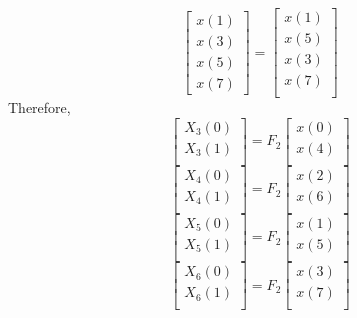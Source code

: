 \documentclass[journal,12pt,twocolumn]{IEEEtran}
\renewcommand\thesection{\arabic{section}}
\begin{document}
\begin{enumerate}[label=\arabic*.,ref=\thesection.\theenumi]
\begin{equation}
\begin{bmatrix}
x(1) \\ 
x(3) \\ 
x(5) \\
x(7)
\end{bmatrix}
 = 
\begin{bmatrix}
x(1) \\ 
x(5) \\ 
x(3) \\ 
x(7) \\
\end{bmatrix}
\end{equation}
Therefore,
\begin{equation}
\begin{bmatrix}
X_{3}(0) \\ 
X_{3}(1)\\ 
\end{bmatrix}
= F_{2}
\begin{bmatrix}
x(0) \\ 
x(4) \\ 
\end{bmatrix}
\end{equation}
\begin{equation}
\begin{bmatrix}
X_{4}(0) \\ 
X_{4}(1)\\ 
\end{bmatrix}
= F_{2}
\begin{bmatrix}
x(2) \\ 
x(6) \\ 
\end{bmatrix}
\end{equation}
\begin{equation}
\begin{bmatrix}
X_{5}(0) \\ 
X_{5}(1)\\ 
\end{bmatrix}
= F_{2}
\begin{bmatrix}
x(1) \\ 
x(5) \\ 
\end{bmatrix}
\end{equation}
\begin{equation}
\begin{bmatrix}
X_{6}(0) \\ 
X_{6}(1)\\ 
\end{bmatrix}
= F_{2}
\begin{bmatrix}
x(3) \\ 
x(7) \\ 

\end{bmatrix}
\end{equation}
\end{enumerate}
\end{document}
